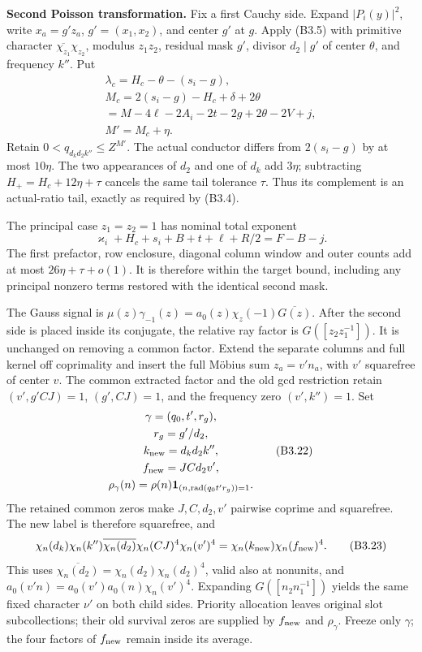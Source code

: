 \documentclass[11pt,a4paper]{article}
\begin{document}
\textbf{Second Poisson transformation.} Fix a first Cauchy side. Expand
\(|P_i(y)|^2\), write \(x_a=g'z_a\), \(g'=(x_1,\allowbreak{}x_2)\), and center \(g'\)
at \(g\). Apply (B3.5) with primitive character
\(\overline{\chi_{z_1}}\chi_{z_2}\), modulus \(z_1z_2\), residual mask
\(g'\), divisor \(d_2\mid g'\) of center \(\theta\), and frequency
\(k''\). Put \[
\begin{gathered}
\lambda_c=H_c-\theta-(s_i-g),\\
M_c=2(s_i-g)-H_c+\delta+2\theta\\
=M-4\ell-2A_i-2t-2g+2\theta-2V+j,
\\ M'=M_c+\eta.
\end{gathered}
\tag{B3.20}
\] Retain \(0<q_{d_kd_2k''}\le Z^{M'}\). The actual conductor differs
from \(2(s_i-g)\) by at most \(10\eta\). The two appearances of \(d_2\)
and one of \(d_k\) add \(3\eta\); subtracting \(H_+=H_c+12\eta+\tau\)
cancels the same tail tolerance \(\tau\). Thus its complement is an
actual-ratio tail, exactly as required by (B3.4).

The principal case \(z_1=z_2=1\) has nominal total exponent \[
\varkappa_i+H_c+s_i+B+t+\ell+R/2=F-B-j.
\tag{B3.21}
\] The first prefactor, row enclosure, diagonal column window and outer
counts add at most \(26\eta+\tau+o(1)\). It is therefore within the
target bound, including any principal nonzero terms restored with the
identical second mask.

The Gauss signal is
\(\mu(z)\gamma_{-1}(z)=a_0(z)\chi_z(-1)\overline{G(z)}\). After the
second side is placed inside its conjugate, the relative ray factor is
\(G([z_2z_1^{-1}])\). It is unchanged on removing a common factor.
Extend the separate columns and full kernel off coprimality and insert
the full Möbius sum \(z_a=v'n_a\), with \(v'\) squarefree of center
\(v\). The common extracted factor and the old gcd restriction retain
\((v',\allowbreak{}g'CJ)=1\), \((g',\allowbreak{}CJ)=1\), and the frequency zero \((v',\allowbreak{}k'')=1\).
Set \[
\begin{gathered}
\gamma=(q_0,t',r_g),\\ r_g=g'/d_2,\\
k_{\rm new}=d_kd_2k'',\\ f_{\rm new}=JCd_2v',
\\\rho_\gamma(n)=\rho(n)\mathbf1_{(n,\operatorname{rad}(q_0t'r_g))=1}.
\end{gathered}
\tag{B3.22}
\] The retained common zeros make \(J,\allowbreak{}C,\allowbreak{}d_2,\allowbreak{}v'\) pairwise coprime and
squarefree. The new label is therefore squarefree, and \[
\chi_n(d_k)\chi_n(k'')\overline{\chi_n(d_2)}
 \chi_n(CJ)^4\chi_n(v')^4
=\chi_n(k_{\rm new})\chi_n(f_{\rm new})^4.
\tag{B3.23}
\] This uses \(\overline{\chi_n(d_2)}=\chi_n(d_2)\chi_n(d_2)^4\), valid
also at nonunits, and \(a_0(v'n)=a_0(v')a_0(n)\chi_n(v')^4\). Expanding
\(G([n_2n_1^{-1}])\) yields the same fixed character \(\nu'\) on both
child sides. Priority allocation leaves original slot subcollections;
their old survival zeros are supplied by \(f_{\rm new}\) and
\(\rho_\gamma\). Freeze only \(\gamma\); the four factors of
\(f_{\rm new}\) remain inside its average.
\end{document}
